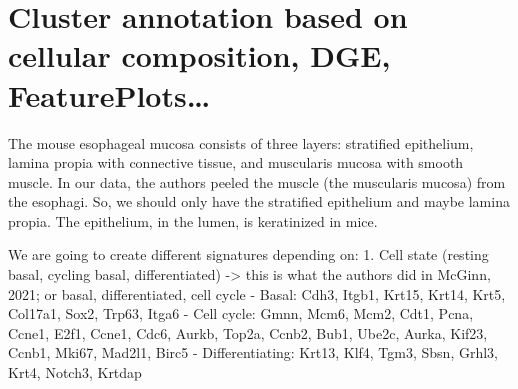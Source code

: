 \documentclass[
  letterpaper,
  DIV=11,
  numbers=noendperiod]{scrreprt}
\begin{document}
\section{Cluster annotation based on cellular composition, DGE,
FeaturePlots\ldots{}}\label{cluster-annotation-based-on-cellular-composition-dge-featureplots}

The mouse esophageal mucosa consists of three layers: stratified
epithelium, lamina propia with connective tissue, and muscularis mucosa
with smooth muscle. In our data, the authors peeled the muscle (the
muscularis mucosa) from the esophagi. So, we should only have the
stratified epithelium and maybe lamina propia. The epithelium, in the
lumen, is keratinized in mice.

We are going to create different signatures depending on: 1. Cell state
(resting basal, cycling basal, differentiated) -\textgreater{} this is
what the authors did in McGinn, 2021; or basal, differentiated, cell
cycle - Basal: Cdh3, Itgb1, Krt15, Krt14, Krt5, Col17a1, Sox2, Trp63,
Itga6 - Cell cycle: Gmnn, Mcm6, Mcm2, Cdt1, Pcna, Ccne1, E2f1, Ccne1,
Cdc6, Aurkb, Top2a, Ccnb2, Bub1, Ube2c, Aurka, Kif23, Ccnb1, Mki67,
Mad2l1, Birc5 - Differentiating: Krt13, Klf4, Tgm3, Sbsn, Grhl3, Krt4,
Notch3, Krtdap
\end{document}
